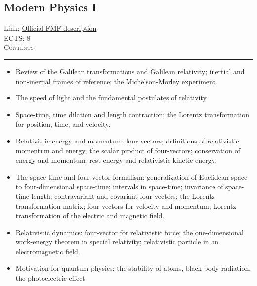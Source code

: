 \documentclass[11pt, a4paper]{article}
\newenvironment{course}[3]{
\subsection{#1}%
Link: \href{#2}{Official FMF description}\\%
ECTS: #3%
\vspace{1ex}
\\
{\large \textsc{Contents}}\\[-0.9ex]%
\rule{\textwidth}{0.5pt}
\vspace{-3ex}
}
{}
\newenvironment{chapter}[1]{
\begin{tcolorbox}[title=#1, breakable]
}
{\end{tcolorbox}}
\begin{document}
\begin{course}{Modern Physics I}{https://www.fmf.uni-lj.si/en/study-physics/programmes/1fiz/2020/7000777/courses/1161/}{8}
    \label{modern_physics_1}

    \begin{chapter}{Special theory of relativity}

        \begin{itemize}
        
            \item Review of the Galilean transformations and Galilean relativity; inertial and non-inertial frames of reference; the Michelson-Morley experiment.

            \item The speed of light and the fundamental postulates of relativity

            \item Space-time, time dilation and length contraction; the Lorentz transformation for position, time, and velocity.

            \item Relativistic energy and momentum: four-vectors; definitions of relativistic momentum and energy; the scalar product of four-vectors; conservation of energy and momentum; rest energy and relativistic kinetic energy.

            \item The space-time and four-vector formalism: generalization of Euclidean space to four-dimensional space-time; intervals in space-time; invariance of space-time length; contravariant and covariant four-vectors; the Lorentz transformation matrix; four vectors for velocity and momentum; Lorentz transformation of the electric and magnetic field.

            \item Relativistic dynamics: four-vector for relativistic force; the one-dimensional work-energy theorem in special relativity; relativistic particle in an electromagnetic field.


        \end{itemize}
        
    \end{chapter}

    \begin{chapter}{Quantum physics}

        \begin{itemize}
        
            \item Motivation for quantum physics: the stability of atoms, black-body radiation, the photoelectric effect.


\end{itemize}
\end{chapter}
\end{course}
\end{document}
